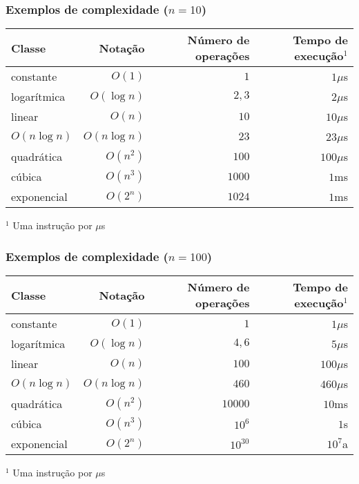 \begin{frame}

	\frametitle{Exemplos de complexidade ($n = 10$)}
	\begin{small}

	\begin{table}[ht]
	\centering
	\begin{tabular}{lrrr}
	\toprule
	\textbf{Classe} & \textbf{Notação} & \textbf{Número de operações} 
	& \textbf{Tempo de execução$^1$} \\
	\toprule
	constante & $O(1)$ & $1$ & $1\mu$s \\
	logarítmica & $O(\log n)$ & $2,3$ & $2\mu$s \\
	linear & $O(n)$ & $10$ & $10\mu$s \\
	$O(n\log n)$ & $O(n\log n)$ & $23$ & $23\mu$s \\
	quadrática & $O(n^2)$ & $100$ & $100\mu$s \\
	cúbica & $O(n^3)$ & $1000$ & $1$ms \\
	exponencial & $O(2^n)$ & $1024$ & $1$ms \\
	\bottomrule
	\end{tabular}
	\end{table}
	$^1$ Uma instrução por $\mu$s

	\end{small}

\end{frame}

\begin{frame}

	\frametitle{Exemplos de complexidade ($n = 100$)}
	\begin{small}

	\begin{table}[ht]
	\centering
	\begin{tabular}{lrrr}
	\toprule
	\textbf{Classe} & \textbf{Notação} & \textbf{Número de operações} 
	& \textbf{Tempo de execução$^1$} \\
	\toprule
	constante & $O(1)$ & $1$ & $1\mu$s \\
	logarítmica & $O(\log n)$ & $4,6$ & $5\mu$s \\
	linear & $O(n)$ & $100$ & $100\mu$s \\
	$O(n\log n)$ & $O(n\log n)$ & $460$ & $460\mu$s \\
	quadrática & $O(n^2)$ &$ 10000$ & $10$ms \\
	cúbica & $O(n^3)$ & $10^6$ & $1$s \\
	exponencial & $O(2^n)$ & $10^{30}$ & $10^7$a \\
	\bottomrule
	\end{tabular}
	\end{table}
	$^1$ Uma instrução por $\mu$s

	\end{small}

\end{frame}

